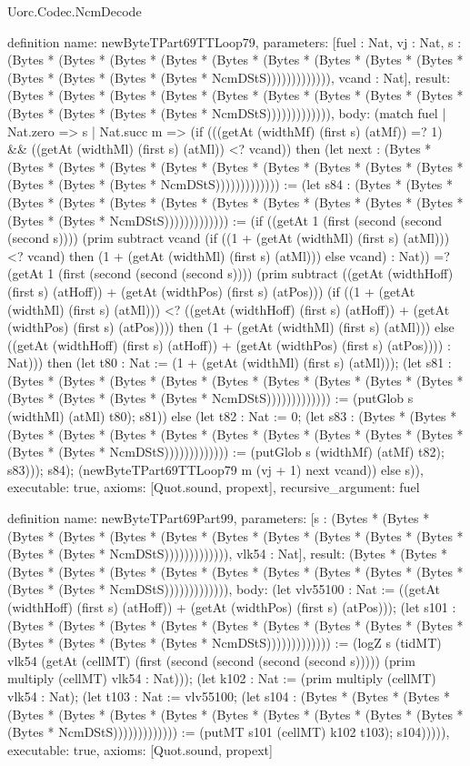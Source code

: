 \begin{lexlean}{Uorc.Codec.NcmDecode}
\begin{semanticmodule}
definition{
  name: newByteTPart69TTLoop79,
  parameters: [fuel : Nat, vj : Nat, s : (Bytes * (Bytes * (Bytes * (Bytes * (Bytes * (Bytes * (Bytes * (Bytes * (Bytes * (Bytes * (Bytes * (Bytes * (Bytes * NcmDStS))))))))))))), vcand : Nat],
  result: (Bytes * (Bytes * (Bytes * (Bytes * (Bytes * (Bytes * (Bytes * (Bytes * (Bytes * (Bytes * (Bytes * (Bytes * (Bytes * NcmDStS))))))))))))),
  body: (match fuel
    | Nat.zero => s
    | Nat.succ m => (if (((getAt (widthMf) (first s) (atMf)) =? 1) && ((getAt (widthMl) (first s) (atMl)) <? vcand)) then (let next : (Bytes * (Bytes * (Bytes * (Bytes * (Bytes * (Bytes * (Bytes * (Bytes * (Bytes * (Bytes * (Bytes * (Bytes * (Bytes * NcmDStS))))))))))))) := (let s84 : (Bytes * (Bytes * (Bytes * (Bytes * (Bytes * (Bytes * (Bytes * (Bytes * (Bytes * (Bytes * (Bytes * (Bytes * (Bytes * NcmDStS))))))))))))) := (if ((getAt 1 (first (second (second (second s)))) (prim subtract vcand (if ((1 + (getAt (widthMl) (first s) (atMl))) <? vcand) then (1 + (getAt (widthMl) (first s) (atMl))) else vcand) : Nat)) =? (getAt 1 (first (second (second (second s)))) (prim subtract ((getAt (widthHoff) (first s) (atHoff)) + (getAt (widthPos) (first s) (atPos))) (if ((1 + (getAt (widthMl) (first s) (atMl))) <? ((getAt (widthHoff) (first s) (atHoff)) + (getAt (widthPos) (first s) (atPos)))) then (1 + (getAt (widthMl) (first s) (atMl))) else ((getAt (widthHoff) (first s) (atHoff)) + (getAt (widthPos) (first s) (atPos)))) : Nat))) then (let t80 : Nat := (1 + (getAt (widthMl) (first s) (atMl))); (let s81 : (Bytes * (Bytes * (Bytes * (Bytes * (Bytes * (Bytes * (Bytes * (Bytes * (Bytes * (Bytes * (Bytes * (Bytes * (Bytes * NcmDStS))))))))))))) := (putGlob s (widthMl) (atMl) t80); s81)) else (let t82 : Nat := 0; (let s83 : (Bytes * (Bytes * (Bytes * (Bytes * (Bytes * (Bytes * (Bytes * (Bytes * (Bytes * (Bytes * (Bytes * (Bytes * (Bytes * NcmDStS))))))))))))) := (putGlob s (widthMf) (atMf) t82); s83))); s84); (newByteTPart69TTLoop79 m (vj + 1) next vcand)) else s)),
  executable: true,
  axioms: [Quot.sound, propext],
  recursive_argument: fuel
}

definition{
  name: newByteTPart69Part99,
  parameters: [s : (Bytes * (Bytes * (Bytes * (Bytes * (Bytes * (Bytes * (Bytes * (Bytes * (Bytes * (Bytes * (Bytes * (Bytes * (Bytes * NcmDStS))))))))))))), vlk54 : Nat],
  result: (Bytes * (Bytes * (Bytes * (Bytes * (Bytes * (Bytes * (Bytes * (Bytes * (Bytes * (Bytes * (Bytes * (Bytes * (Bytes * NcmDStS))))))))))))),
  body: (let vlv55100 : Nat := ((getAt (widthHoff) (first s) (atHoff)) + (getAt (widthPos) (first s) (atPos))); (let s101 : (Bytes * (Bytes * (Bytes * (Bytes * (Bytes * (Bytes * (Bytes * (Bytes * (Bytes * (Bytes * (Bytes * (Bytes * (Bytes * NcmDStS))))))))))))) := (logZ s (tidMT) vlk54 (getAt (cellMT) (first (second (second (second (second s))))) (prim multiply (cellMT) vlk54 : Nat))); (let k102 : Nat := (prim multiply (cellMT) vlk54 : Nat); (let t103 : Nat := vlv55100; (let s104 : (Bytes * (Bytes * (Bytes * (Bytes * (Bytes * (Bytes * (Bytes * (Bytes * (Bytes * (Bytes * (Bytes * (Bytes * (Bytes * NcmDStS))))))))))))) := (putMT s101 (cellMT) k102 t103); s104))))),
  executable: true,
  axioms: [Quot.sound, propext]
}


\end{semanticmodule}
\end{lexlean}
